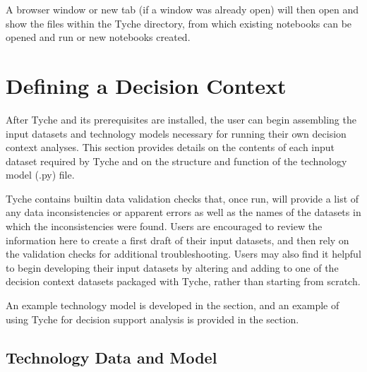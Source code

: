 \documentclass[letterpaper,10pt,english]{sphinxmanual}
\begin{document}
\sphinxAtStartPar
A browser window or new tab (if a window was already open) will then open and show the files within the Tyche directory, from which existing notebooks can be opened and run or new notebooks created.


\section{Defining a Decision Context}
\label{\detokenize{cheat-sheet:defining-a-decision-context}}
\sphinxAtStartPar
After Tyche and its prerequisites are installed, the user can begin assembling the input datasets and technology models necessary for running their own decision context analyses. This section provides details on the contents of each input dataset required by Tyche and on the structure and function of the technology model (.py) file.

\sphinxAtStartPar
Tyche contains built\sphinxhyphen{}in data validation checks that, once run, will provide a list of any data inconsistencies or apparent errors as well as the names of the datasets in which the inconsistencies were found. Users are encouraged to review the information here to create a first draft of their input datasets, and then rely on the validation checks for additional troubleshooting. Users may also find it helpful to begin developing their input datasets by altering and adding to one of the decision context datasets packaged with Tyche, rather than starting from scratch.

\sphinxAtStartPar
An example technology model is developed in the {\hyperref[\detokenize{example-technology:sec-techmodelexample}]{}} section, and an example of using Tyche for decision support analysis is provided in the {\hyperref[\detokenize{example-analysis:sec-analysisexample}]{}} section.


\subsection{Technology Data and Model}
\label{\detokenize{cheat-sheet:technology-data-and-model}}
\end{document}
